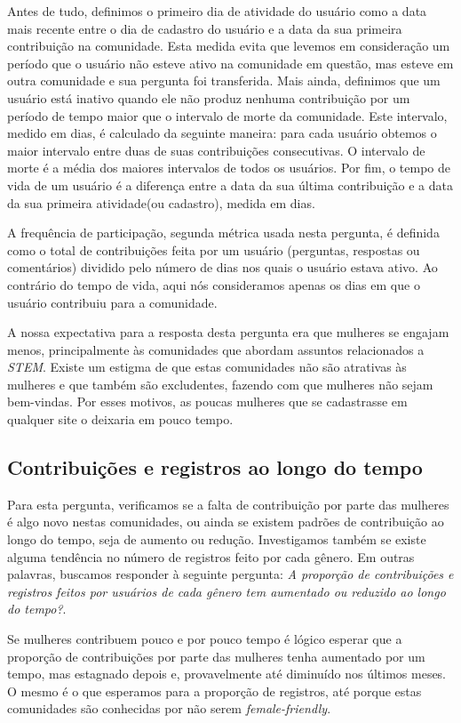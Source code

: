 Antes de tudo, definimos o primeiro dia de atividade do usuário como a data mais recente entre o dia de cadastro do usuário e a data da sua primeira contribuição na comunidade. Esta medida evita que levemos em consideração um período que o usuário não esteve ativo na comunidade em questão, mas esteve em outra comunidade e sua pergunta foi transferida. Mais ainda, definimos que um usuário está inativo quando ele não produz nenhuma contribuição por um período de tempo maior que o intervalo de morte da comunidade. Este intervalo, medido em dias, é calculado da seguinte maneira: para cada usuário obtemos o maior intervalo entre duas de suas contribuições consecutivas. O intervalo de morte é a média dos maiores intervalos de todos os usuários. Por fim, o tempo de vida de um usuário é a diferença entre a data da sua última contribuição e a data da sua primeira atividade(ou cadastro), medida em dias.

A frequência de participação, segunda métrica usada nesta pergunta, é definida como o total de contribuições feita por um usuário (perguntas, respostas ou comentários) dividido pelo número de dias nos quais o usuário estava ativo. Ao contrário do tempo de vida, aqui nós consideramos apenas os dias em que o usuário contribuiu para a comunidade.

A nossa expectativa para a resposta desta pergunta era que mulheres se engajam menos, principalmente às comunidades que abordam assuntos relacionados a \emph{STEM}. Existe um estigma de que estas comunidades não são atrativas às mulheres e que também são excludentes, fazendo com que mulheres não sejam bem-vindas. Por esses motivos, as poucas mulheres que se cadastrasse em qualquer site o deixaria em pouco tempo.

\subsection{Contribuições e registros ao longo do tempo}

Para esta pergunta, verificamos se a falta de contribuição por parte das mulheres é algo novo nestas comunidades, ou ainda se existem padrões de contribuição ao longo do tempo, seja de aumento ou redução. Investigamos também se existe alguma tendência no número de registros feito por cada gênero. Em outras palavras, buscamos responder à seguinte pergunta: \textit{A proporção de contribuições e registros feitos por usuários de cada gênero tem aumentado ou reduzido ao longo do tempo?}. 

Se mulheres contribuem pouco e por pouco tempo é lógico esperar que a proporção de contribuições por parte das mulheres tenha aumentado por um tempo, mas estagnado depois e, provavelmente até diminuído nos últimos meses. O mesmo é o que esperamos para a proporção de registros, até porque estas comunidades são conhecidas por não serem \emph{female-friendly}.

